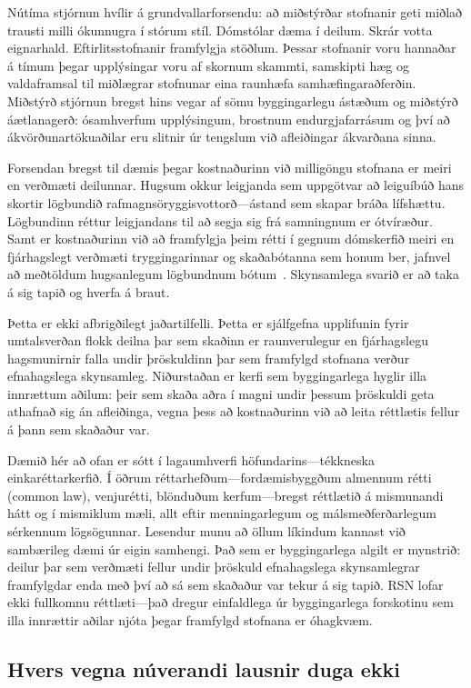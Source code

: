 \documentclass[11pt,a4paper,twocolumn]{article}
\begin{document}
Nútíma stjórnun hvílir á grundvallarforsendu: að miðstýrðar stofnanir geti miðlað trausti milli ókunnugra í stórum stíl. Dómstólar dæma í deilum. Skrár votta eignarhald. Eftirlitsstofnanir framfylgja stöðlum. Þessar stofnanir voru hannaðar á tímum þegar upplýsingar voru af skornum skammti, samskipti hæg og valdaframsal til miðlægrar stofnunar eina raunhæfa samhæfingaraðferðin. Miðstýrð stjórnun bregst hins vegar af sömu byggingarlegu ástæðum og miðstýrð áætlanagerð: ósamhverfum upplýsingum, brostnum endurgjafarrásum og því að ákvörðunartökuaðilar eru slitnir úr tengslum við afleiðingar ákvarðana sinna.

Forsendan bregst til dæmis þegar kostnaðurinn við milligöngu stofnana er meiri en verðmæti deilunnar. Hugsum okkur leigjanda sem uppgötvar að leiguíbúð hans skortir lögbundið rafmagnsöryggisvottorð---ástand sem skapar bráða lífshættu. Lögbundinn réttur leigjandans til að segja sig frá samningnum er ótvíræður. Samt er kostnaðurinn við að framfylgja þeim rétti í gegnum dómskerfið meiri en fjárhagslegt verðmæti tryggingarinnar og skaðabótanna sem honum ber, jafnvel að meðtöldum hugsanlegum lögbundnum bótum~\cite{czcourtfees}. Skynsamlega svarið er að taka á sig tapið og hverfa á braut.

Þetta er ekki afbrigðilegt jaðartilfelli. Þetta er sjálfgefna upplifunin fyrir umtalsverðan flokk deilna þar sem skaðinn er raunverulegur en fjárhagslegu hagsmunirnir falla undir þröskuldinn þar sem framfylgd stofnana verður efnahagslega skynsamleg. Niðurstaðan er kerfi sem byggingarlega hyglir illa innrættum aðilum: þeir sem skaða aðra í magni undir þessum þröskuldi geta athafnað sig án afleiðinga, vegna þess að kostnaðurinn við að leita réttlætis fellur á þann sem skaðaður var.

Dæmið hér að ofan er sótt í lagaumhverfi höfundarins---tékkneska einkaréttarkerfið. Í öðrum réttarhefðum---fordæmisbyggðum almennum rétti (common law), venjurétti, blönduðum kerfum---bregst réttlætið á mismunandi hátt og í mismiklum mæli, allt eftir menningarlegum og málsmeðferðarlegum sérkennum lögsögunnar. Lesendur munu að öllum líkindum kannast við sambærileg dæmi úr eigin samhengi. Það sem er byggingarlega algilt er mynstrið: deilur þar sem verðmæti fellur undir þröskuld efnahagslega skynsamlegrar framfylgdar enda með því að sá sem skaðaður var tekur á sig tapið. RSN lofar ekki fullkomnu réttlæti---það dregur einfaldlega úr byggingarlega forskotinu sem illa innrættir aðilar njóta þegar framfylgd stofnana er óhagkvæm.

\subsection{Hvers vegna núverandi lausnir duga ekki}
\end{document}
